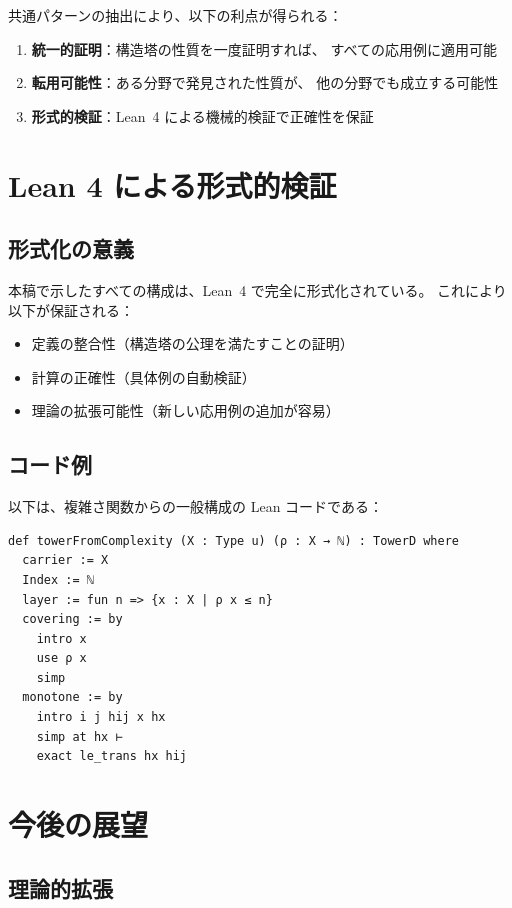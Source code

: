 \documentclass[a4paper,12pt]{ltjsarticle}
\theoremstyle{definition}
\begin{document}
共通パターンの抽出により、以下の利点が得られる：

\begin{enumerate}
  \item \textbf{統一的証明}：構造塔の性質を一度証明すれば、
        すべての応用例に適用可能
  \item \textbf{転用可能性}：ある分野で発見された性質が、
        他の分野でも成立する可能性
  \item \textbf{形式的検証}：Lean~4 による機械的検証で正確性を保証
\end{enumerate}

\section{Lean 4 による形式的検証}

\subsection{形式化の意義}

本稿で示したすべての構成は、Lean~4 で完全に形式化されている。
これにより以下が保証される：

\begin{itemize}
  \item 定義の整合性（構造塔の公理を満たすことの証明）
  \item 計算の正確性（具体例の自動検証）
  \item 理論の拡張可能性（新しい応用例の追加が容易）
\end{itemize}

\subsection{コード例}

以下は、複雑さ関数からの一般構成の Lean コードである：

\begin{verbatim}
def towerFromComplexity (X : Type u) (ρ : X → ℕ) : TowerD where
  carrier := X
  Index := ℕ
  layer := fun n => {x : X | ρ x ≤ n}
  covering := by
    intro x
    use ρ x
    simp
  monotone := by
    intro i j hij x hx
    simp at hx ⊢
    exact le_trans hx hij
\end{verbatim}

\section{今後の展望}

\subsection{理論的拡張}
\end{document}

